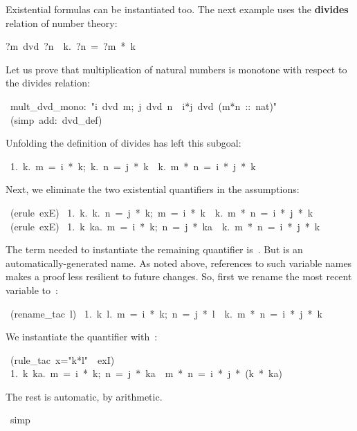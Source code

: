 \medskip
Existential formulas can be instantiated too.  The next example uses the 
\textbf{divides} relation
of number theory: 
\begin{isabelle}
?m\ dvd\ ?n\ \isasymequiv\ {\isasymexists}k.\ ?n\ =\ ?m\ *\ k
\end{isabelle}

Let us prove that multiplication of natural numbers is monotone with
respect to the divides relation:
\begin{isabelle}
\ mult_dvd_mono:\ "{\isasymlbrakk}i\ dvd\ m;\ j\ dvd\
n\isasymrbrakk\ \isasymLongrightarrow\ i*j\ dvd\ (m*n\ ::\ nat)"\isanewline
\isacommand{apply}\ (simp\ add:\ dvd_def)
\end{isabelle}
%
Unfolding the definition of divides has left this subgoal:
\begin{isabelle}
\ 1.\ \isasymlbrakk \isasymexists k.\ m\ =\ i\ *\ k;\ \isasymexists k.\ n\
=\ j\ *\ k\isasymrbrakk \ \isasymLongrightarrow \ \isasymexists k.\ m\ *\
n\ =\ i\ *\ j\ *\ k
\end{isabelle}
%
Next, we eliminate the two existential quantifiers in the assumptions:
\begin{isabelle}
\ (erule\ exE)\isanewline
\ 1.\ \isasymAnd k.\ \isasymlbrakk \isasymexists k.\ n\ =\ j\ *\ k;\ m\ =\
i\ *\ k\isasymrbrakk \ \isasymLongrightarrow \ \isasymexists k.\ m\ *\ n\
=\ i\ *\ j\ *\ k%
\isanewline
\isacommand{apply}\ (erule\ exE)
\isanewline
\ 1.\ \isasymAnd k\ ka.\ \isasymlbrakk m\ =\ i\ *\ k;\ n\ =\ j\ *\
ka\isasymrbrakk \ \isasymLongrightarrow \ \isasymexists k.\ m\ *\ n\ =\ i\
*\ j\ *\ k
\end{isabelle}
%
The term needed to instantiate the remaining quantifier is~\isa{k*ka}.  But
\isa{ka} is an automatically-generated name.  As noted above, references to
such variable names makes a proof less resilient to future changes.  So,
first we rename the most recent variable to~\isa{l}:
\begin{isabelle}
\ (rename_tac\ l)\isanewline
\ 1.\ \isasymAnd k\ l.\ \isasymlbrakk m\ =\ i\ *\ k;\ n\ =\ j\ *\ l\isasymrbrakk \
\isasymLongrightarrow \ \isasymexists k.\ m\ *\ n\ =\ i\ *\ j\ *\ k%
\end{isabelle}

We instantiate the quantifier with~\isa{k*l}:
\begin{isabelle}
\ (rule_tac\ x="k*l"\ \ exI)\ \isanewline
\ 1.\ \isasymAnd k\ ka.\ \isasymlbrakk m\ =\ i\ *\ k;\ n\ =\ j\ *\
ka\isasymrbrakk \ \isasymLongrightarrow \ m\ *\ n\ =\ i\
*\ j\ *\ (k\ *\ ka)
\end{isabelle}
%
The rest is automatic, by arithmetic.
\begin{isabelle}
\isacommand{apply}\ simp\isanewline
\isacommand{done}\isanewline
\end{isabelle}




